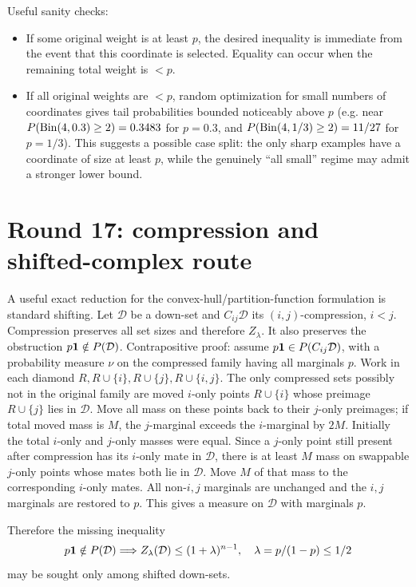 \documentclass[12pt]{article}
\begin{document}
Useful sanity checks:
\begin{itemize}
\item If some original weight is at least \(p\), the desired inequality is
immediate from the event that this coordinate is selected.  Equality can occur
when the remaining total weight is \(<p\).
\item If all original weights are \(<p\), random optimization for small
numbers of coordinates gives tail probabilities bounded noticeably above \(p\)
(e.g. near \(P({\rm Bin}(4,0.3)\ge2)=0.3483\) for \(p=0.3\), and
\(P({\rm Bin}(4,1/3)\ge2)=11/27\) for \(p=1/3\)).  This suggests a possible
case split: the only sharp examples have a coordinate of size at least \(p\),
while the genuinely ``all small'' regime may admit a stronger lower bound.
\end{itemize}


\section*{Round 17: compression and shifted-complex route}

A useful exact reduction for the convex-hull/partition-function formulation is
standard shifting.  Let \(\mathcal D\) be a down-set and \(C_{ij}\mathcal D\)
its \((i,j)\)-compression, \(i<j\).  Compression preserves all set sizes and
therefore \(Z_\lambda\).  It also preserves the obstruction
\(p{\bf1}\notin P(\mathcal D)\).  Contrapositive proof: assume
\(p{\bf1}\in P(C_{ij}\mathcal D)\), with a probability measure \(\nu\) on the
compressed family having all marginals \(p\).  Work in each diamond
\(R,R\cup\{i\},R\cup\{j\},R\cup\{i,j\}\).  The only compressed sets possibly
not in the original family are moved \(i\)-only points \(R\cup\{i\}\) whose
preimage \(R\cup\{j\}\) lies in \(\mathcal D\).  Move all mass on these points
back to their \(j\)-only preimages; if total moved mass is \(M\), the
\(j\)-marginal exceeds the \(i\)-marginal by \(2M\).  Initially the total
\(i\)-only and \(j\)-only masses were equal.  Since a \(j\)-only point still
present after compression has its \(i\)-only mate in \(\mathcal D\), there is at
least \(M\) mass on swappable \(j\)-only points whose mates both lie in
\(\mathcal D\).  Move \(M\) of that mass to the corresponding \(i\)-only mates.
All non-\(i,j\) marginals are unchanged and the \(i,j\) marginals are restored
to \(p\).  This gives a measure on \(\mathcal D\) with marginals \(p\).

Therefore the missing inequality
\[
  p{\bf1}\notin P(\mathcal D)\Longrightarrow
  Z_\lambda(\mathcal D)\le(1+\lambda)^{n-1},\quad
  \lambda=p/(1-p)\le1/2
\]
may be sought only among shifted down-sets.
\end{document}
